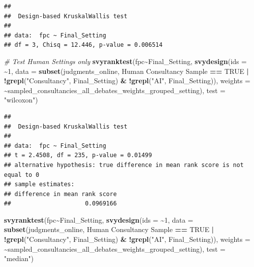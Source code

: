 \documentclass[
]{article}
\newenvironment{Shaded}{\begin{snugshade}}{\end{snugshade}}
\newcommand{\AttributeTok}[1]{\textcolor[rgb]{0.13,0.29,0.53}{#1}}
\newcommand{\CommentTok}[1]{\textcolor[rgb]{0.56,0.35,0.01}{\textit{#1}}}
\newcommand{\ConstantTok}[1]{\textcolor[rgb]{0.56,0.35,0.01}{#1}}
\newcommand{\DecValTok}[1]{\textcolor[rgb]{0.00,0.00,0.81}{#1}}
\newcommand{\FunctionTok}[1]{\textcolor[rgb]{0.13,0.29,0.53}{\textbf{#1}}}
\newcommand{\NormalTok}[1]{#1}
\newcommand{\SpecialCharTok}[1]{\textcolor[rgb]{0.81,0.36,0.00}{\textbf{#1}}}
\newcommand{\StringTok}[1]{\textcolor[rgb]{0.31,0.60,0.02}{#1}}
\begin{document}
\begin{verbatim}
## 
##  Design-based KruskalWallis test
## 
## data:  fpc ~ Final_Setting
## df = 3, Chisq = 12.446, p-value = 0.006514
\end{verbatim}

\begin{Shaded}
\begin{Highlighting}[]
\CommentTok{\# Test Human Settings only}
\FunctionTok{svyranktest}\NormalTok{(fpc}\SpecialCharTok{\textasciitilde{}}\NormalTok{Final\_Setting, }
            \FunctionTok{svydesign}\NormalTok{(}\AttributeTok{ids =} \SpecialCharTok{\textasciitilde{}}\DecValTok{1}\NormalTok{, }\AttributeTok{data =} \FunctionTok{subset}\NormalTok{(judgments\_online, }\StringTok{\textasciigrave{}}\AttributeTok{Human Consultancy Sample}\StringTok{\textasciigrave{}} \SpecialCharTok{==} \ConstantTok{TRUE} \SpecialCharTok{|} \SpecialCharTok{!}\FunctionTok{grepl}\NormalTok{(}\StringTok{"Consultancy"}\NormalTok{, Final\_Setting) }\SpecialCharTok{\&} \SpecialCharTok{!}\FunctionTok{grepl}\NormalTok{(}\StringTok{"AI"}\NormalTok{, Final\_Setting)), }\AttributeTok{weights =} \SpecialCharTok{\textasciitilde{}}\NormalTok{sampled\_consultancies\_all\_debates\_weights\_grouped\_setting),}
            \AttributeTok{test =} \StringTok{"wilcoxon"}\NormalTok{)}
\end{Highlighting}
\end{Shaded}

\begin{verbatim}
## 
##  Design-based KruskalWallis test
## 
## data:  fpc ~ Final_Setting
## t = 2.4508, df = 235, p-value = 0.01499
## alternative hypothesis: true difference in mean rank score is not equal to 0
## sample estimates:
## difference in mean rank score 
##                     0.0969166
\end{verbatim}

\begin{Shaded}
\begin{Highlighting}[]
\FunctionTok{svyranktest}\NormalTok{(fpc}\SpecialCharTok{\textasciitilde{}}\NormalTok{Final\_Setting, }
            \FunctionTok{svydesign}\NormalTok{(}\AttributeTok{ids =} \SpecialCharTok{\textasciitilde{}}\DecValTok{1}\NormalTok{, }\AttributeTok{data =} \FunctionTok{subset}\NormalTok{(judgments\_online, }\StringTok{\textasciigrave{}}\AttributeTok{Human Consultancy Sample}\StringTok{\textasciigrave{}} \SpecialCharTok{==} \ConstantTok{TRUE} \SpecialCharTok{|} \SpecialCharTok{!}\FunctionTok{grepl}\NormalTok{(}\StringTok{"Consultancy"}\NormalTok{, Final\_Setting) }\SpecialCharTok{\&} \SpecialCharTok{!}\FunctionTok{grepl}\NormalTok{(}\StringTok{"AI"}\NormalTok{, Final\_Setting)), }\AttributeTok{weights =} \SpecialCharTok{\textasciitilde{}}\NormalTok{sampled\_consultancies\_all\_debates\_weights\_grouped\_setting),}
            \AttributeTok{test =} \StringTok{"median"}\NormalTok{)}
\end{Highlighting}
\end{Shaded}
\end{document}
